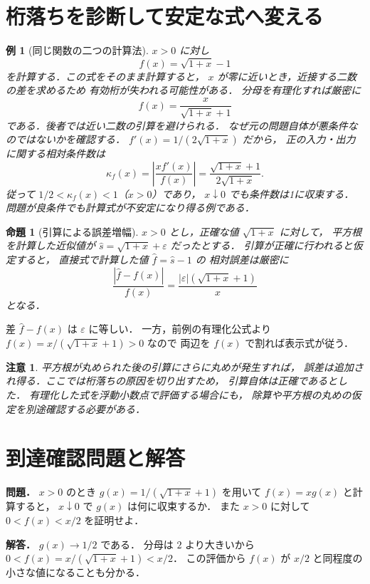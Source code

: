 \documentclass[a5paper,10pt,onecolumn]{jsarticle}
\makeatletter
\theoremstyle{mathnotetheorem}
\newtheorem{proposition}[theorem]{命題}
\newtheorem{example}[theorem]{例}
\newtheorem{remark}[theorem]{注意}
\renewcommand{\proofname}{証明}
\renewenvironment{proof}[1][\proofname]{%
  \par\pushQED{\qed}\normalfont\topsep4\p@\@plus2\p@\relax
  \trivlist\item[\hskip\labelsep\bfseries #1]\ignorespaces
}{\popQED\endtrivlist\@endpefalse}
\makeatother
\begin{document}
\section{桁落ちを診断して安定な式へ変える}
\begin{example}[同じ関数の二つの計算法]
$x>0$ に対し
\[
 f(x)=\sqrt{1+x}-1
\]
を計算する．この式をそのまま計算すると，
$x$ が零に近いとき，近接する二数の差を求めるため
有効桁が失われる可能性がある．
分母を有理化すれば厳密に
\[
 f(x)=\frac{x}{\sqrt{1+x}+1}
\]
である．後者では近い二数の引算を避けられる．
なぜ元の問題自体が悪条件なのではないかを確認する．
$f'(x)=1/(2\sqrt{1+x})$ だから，
正の入力・出力に関する相対条件数は
\[
 \kappa_f(x)=\left|\frac{xf'(x)}{f(x)}\right|
 =\frac{\sqrt{1+x}+1}{2\sqrt{1+x}}.
\]
従って $1/2<\kappa_f(x)<1$（$x>0$）であり，
$x\downarrow0$ でも条件数は1に収束する．
問題が良条件でも計算式が不安定になり得る例である．
\end{example}
\begin{proposition}[引算による誤差増幅]
$x>0$ とし，正確な値 $\sqrt{1+x}$ に対して，
平方根を計算した近似値が
$\widehat s=\sqrt{1+x}+\varepsilon$ だったとする．
引算が正確に行われると仮定すると，
直接式で計算した値 $\widehat f=\widehat s-1$ の
相対誤差は厳密に
\[
 \frac{|\widehat f-f(x)|}{f(x)}
 =\frac{|\varepsilon|(\sqrt{1+x}+1)}{x}
\]
となる．
\end{proposition}
\begin{proof}
差 $\widehat f-f(x)$ は $\varepsilon$ に等しい．
一方，前例の有理化公式より
$f(x)=x/(\sqrt{1+x}+1)>0$ なので
両辺を $f(x)$ で割れば表示式が従う．
\end{proof}
\begin{remark}
平方根が丸められた後の引算にさらに丸めが発生すれば，
誤差は追加され得る．ここでは桁落ちの原因を切り出すため，
引算自体は正確であるとした．
有理化した式を浮動小数点で評価する場合にも，
除算や平方根の丸めの仮定を別途確認する必要がある．
\end{remark}
\section*{到達確認問題と解答}
\noindent\textbf{問題．}
$x>0$ のとき
$g(x)=1/(\sqrt{1+x}+1)$ を用いて
$f(x)=xg(x)$ と計算すると，
$x\downarrow0$ で $g(x)$ は何に収束するか．
また $x>0$ に対して
$0<f(x)<x/2$ を証明せよ．

\medskip\noindent\textbf{解答．}
$g(x)\to1/2$ である．
分母は $2$ より大きいから
$0<f(x)=x/(\sqrt{1+x}+1)<x/2$．
この評価から $f(x)$ が $x/2$ と同程度の
小さな値になることも分かる．
\end{document}
